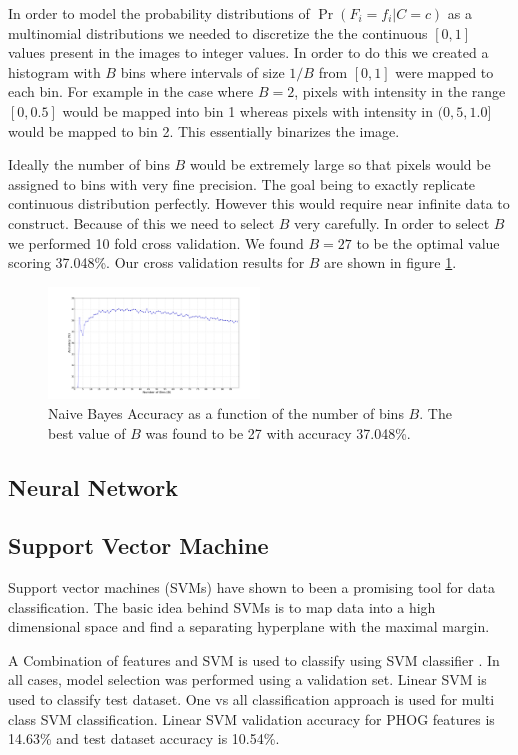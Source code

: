 \documentclass[10pt,twocolumn]{article}
\begin{document}
In order to model the probability distributions of $\Pr(F_i = f_i | C = c)$ as a multinomial distributions we needed to discretize the the continuous $[0,1]$ values present in the images to integer values. In order to do this we created a histogram with $B$ bins where intervals of size $1/B$ from $[0,1]$ were mapped to each bin. For example in the case where $B = 2$, pixels with intensity in the range $[0,0.5]$ would be mapped into bin 1 whereas pixels with intensity in $(0,5,1.0]$ would be mapped to bin 2. This essentially binarizes the image.

Ideally the number of bins $B$ would be extremely large so that pixels would be assigned to bins with very fine precision. The goal being to exactly replicate continuous distribution perfectly. However this would require near infinite data to construct. Because of this we need to select $B$ very carefully. In order to select $B$ we performed 10 fold cross validation. We found $B=27$ to be the optimal value scoring 37.048\%. Our cross validation results for $B$ are shown in figure \ref{bins}.
\begin{figure}
\includegraphics[trim=150 40 150 50,clip=true,width=0.5\textwidth]{./figure_1.png}
\caption{Naive Bayes Accuracy as a function of the number of bins $B$. The best value of $B$ was found to be 27 with accuracy 37.048\%.}
\label{bins}
\end{figure}
\subsection{Neural Network}
\subsection{Support Vector Machine}
Support vector machines (SVMs) have shown to been a promising tool for data classification. The basic idea behind SVMs is to map data into a high dimensional space and find a separating hyperplane with the maximal margin.

A Combination of features and SVM is used to classify using SVM classifier \cite {chen2006combining}. In all cases, model selection was performed using a validation set. Linear SVM is used to classify test dataset. One vs all classification approach is used for multi class SVM classification. Linear SVM validation accuracy for PHOG features is 14.63\% and test dataset accuracy is 10.54\%.
\end{document}
